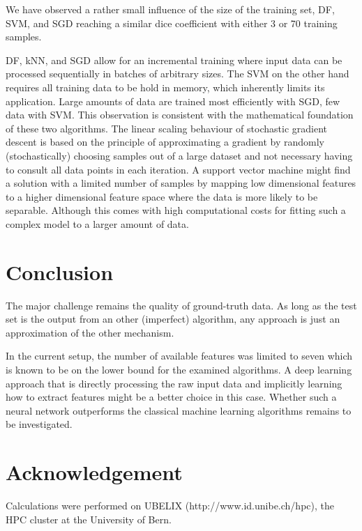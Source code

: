 \documentclass[journal]{IEEEtran}
\begin{document}
We have observed a rather small influence of the size of the training set, DF, SVM, and SGD reaching a similar dice coefficient with either 3 or 70 training samples.

DF, kNN, and SGD allow for an incremental training where input data can be processed sequentially in batches of arbitrary sizes. The SVM on the other hand requires all training data to be hold in memory, which inherently limits its application. Large amounts of data are trained most efficiently with SGD, few data with SVM. This observation is consistent with the mathematical foundation of these two algorithms. The linear scaling behaviour of stochastic gradient descent is based on the principle of approximating a gradient by randomly (stochastically) choosing samples out of a large dataset and not necessary having to consult all data points in each iteration. A support vector machine might find a solution with a limited number of samples by mapping low dimensional features to a higher dimensional feature space where the data is more likely to be separable. Although this comes with high computational costs for fitting such a complex model to a larger amount of data.

\section{Conclusion}
The major challenge remains the quality of ground-truth data. As long as the test set is the output from an other (imperfect) algorithm, any approach is just an approximation of the other mechanism.

In the current setup, the number of available features was limited to seven which is known to be on the lower bound for the examined algorithms. A deep learning approach that is directly processing the raw input data and implicitly learning how to extract features might be a better choice in this case. Whether such a neural network outperforms the classical machine learning algorithms remains to be investigated.

\section*{Acknowledgement}
Calculations were performed on UBELIX (http://www.id.unibe.ch/hpc), the HPC cluster at the University of Bern.



\end{document}
